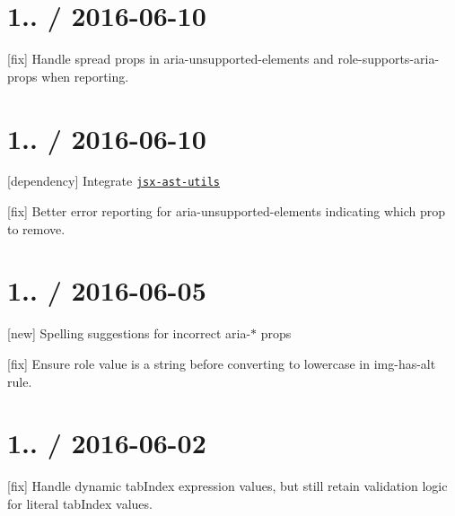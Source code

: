 \section*{1.. / 2016-\/06-\/10 }


\begin{DoxyItemize}
\item \mbox{[}fix\mbox{]} Handle spread props in {\ttfamily aria-\/unsupported-\/elements} and {\ttfamily role-\/supports-\/aria-\/props} when reporting.
\end{DoxyItemize}

\section*{1.. / 2016-\/06-\/10 }


\begin{DoxyItemize}
\item \mbox{[}dependency\mbox{]} Integrate \href{https://github.com/evcohen/jsx-ast-utils}{\tt jsx-\/ast-\/utils}
\item \mbox{[}fix\mbox{]} Better error reporting for aria-\/unsupported-\/elements indicating which prop to remove.
\end{DoxyItemize}

\section*{1.. / 2016-\/06-\/05 }


\begin{DoxyItemize}
\item \mbox{[}new\mbox{]} Spelling suggestions for incorrect {\ttfamily aria-\/$\ast$} props
\item \mbox{[}fix\mbox{]} Ensure {\ttfamily role} value is a string before converting to lowercase in {\ttfamily img-\/has-\/alt} rule.
\end{DoxyItemize}

\section*{1.. / 2016-\/06-\/02 }


\begin{DoxyItemize}
\item \mbox{[}fix\mbox{]} Handle dynamic {\ttfamily tab\+Index} expression values, but still retain validation logic for literal {\ttfamily tab\+Index} values.
\end{DoxyItemize}

